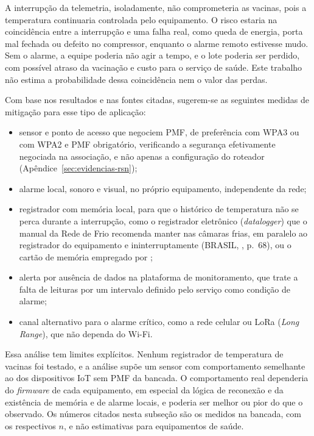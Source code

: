 A interrupção da telemetria, isoladamente, não comprometeria as vacinas, pois a temperatura continuaria controlada pelo equipamento. O risco estaria na coincidência entre a interrupção e uma falha real, como queda de energia, porta mal fechada ou defeito no compressor, enquanto o alarme remoto estivesse mudo. Sem o alarme, a equipe poderia não agir a tempo, e o lote poderia ser perdido, com possível atraso da vacinação e custo para o serviço de saúde. Este trabalho não estima a probabilidade dessa coincidência nem o valor das perdas.

Com base nos resultados e nas fontes citadas, sugerem-se as seguintes medidas de mitigação para esse tipo de aplicação:

\begin{itemize}
    \item sensor e ponto de acesso que negociem PMF, de preferência com WPA3 ou com WPA2 e PMF obrigatório, verificando a segurança efetivamente negociada na associação, e não apenas a configuração do roteador (Apêndice~\ref{sec:evidencias-rsn});
    \item alarme local, sonoro e visual, no próprio equipamento, independente da rede;
    \item registrador com memória local, para que o histórico de temperatura não se perca durante a interrupção, como o registrador eletrônico (\textit{datalogger}) que o manual da Rede de Frio recomenda manter nas câmaras frias, em paralelo ao registrador do equipamento e ininterruptamente (BRASIL, \citeyear{BrasilRedeFrio2025}, p.~68), ou o cartão de memória empregado por ;
    \item alerta por ausência de dados na plataforma de monitoramento, que trate a falta de leituras por um intervalo definido pelo serviço como condição de alarme;
    \item canal alternativo para o alarme crítico, como a rede celular ou LoRa (\textit{Long Range}), que não dependa do Wi-Fi.
\end{itemize}

Essa análise tem limites explícitos. Nenhum registrador de temperatura de vacinas foi testado, e a análise supõe um sensor com comportamento semelhante ao dos dispositivos IoT sem PMF da bancada. O comportamento real dependeria do \textit{firmware} de cada equipamento, em especial da lógica de reconexão e da existência de memória e de alarme locais, e poderia ser melhor ou pior do que o observado. Os números citados nesta subseção são os medidos na bancada, com os respectivos $n$, e não estimativas para equipamentos de saúde.

